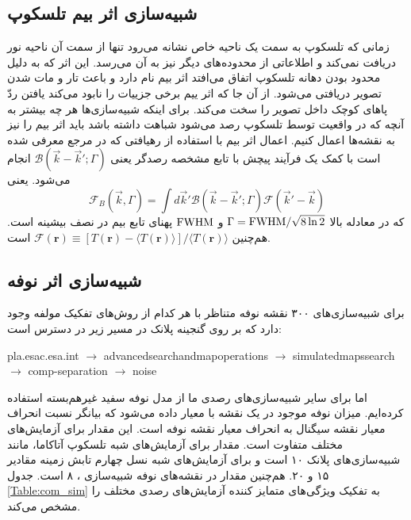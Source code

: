 \subsection{شبیه‌سازی اثر بیم تلسکوپ} 
 زمانی که تلسکوپ به سمت یک ناحیه خاص نشانه می‌رود تنها از سمت آن ناحیه نور دریافت نمی‌کند و اطلاعاتی از محدوده‌های دیگر نیز به آن می‌رسد. این اثر که به دلیل محدود بودن دهانه تلسکوپ اتفاق می‌افتد اثر بیم
  نام دارد و باعث تار و مات شدن تصویر دریافتی می‌شود. از آن جا که اثر ییم برخی جزییات را نابود می‌کند یافتن ردّ پاهای کوچک داخل تصویر را سخت می‌کند. برای اینکه شبیه‌سازی‌ها هر چه بیشتر به آنچه که در واقعیت توسط تلسکوپ رصد می‌شود شباهت داشته باشد باید اثر بیم را نیز به نقشه‌ها اعمال کنیم. 
 اعمال اثر بیم با استفاده از رهیافتی که در مرجع  
 \cite{Bond:1987ub}
 معرفی شده است با کمک یک فرآیند پیچش با تابع مشخصه رصدگر یعنی $\mathcal{B}(\vec{k}-\vec{k}';\Gamma)$ انجام می‌شود. یعنی 
 \begin{equation} 
 \label{convlo} 
 {\mathcal{F}}_{B}(\vec{k},\Gamma)=\int d\vec{k}'\mathcal{B}(\vec{k}-\vec{k}';\Gamma){\mathcal{F}}(\vec{k}'-\vec{k}) 
 \end{equation} 
 که در معادله بالا $\Gamma={\rm FWHM}/\sqrt{8\ln 2}$ و ${\rm FWHM}$ پهنای تابع بیم در نصف بیشینه 
 است. هم‌چنین 
 $\mathcal{F}(\textbf{r})\equiv [T(\textbf{r})-\langle T(\textbf{r})\rangle]/\langle T(\textbf{r})\rangle$
 است.
\subsection{شبیه‌سازی اثر نوفه} 
 برای شبیه‌سازی‌های 
 ۳۰۰ نقشه نوفه
  متناظر با هر کدام از روش‌های تفکیک مولفه وجود دارد که بر روی گنجینه پلانک در مسیر زیر در دسترس است:\\
 \begin{latin}
  pla.esac.esa.int $\to$ advanced\;search\;and\;map\;operations $\to$ simulated\;maps\;search $\to$ comp-separation $\to$ noise	
 \end{latin}

   اما برای سایر شبیه‌سازی‌های رصدی ما از مدل نوفه سفید غیرهم‌بسته استفاده کرده‌ایم.
 میزان نوفه موجود در یک نقشه با معیار 
 داده می‌شود که بیانگر نسبت انحراف معیار نقشه سیگنال به انحراف معیار نقشه نوفه است. این مقدار برای آزمایش‌های مختلف متفاوت است. مقدار  برای آزمایش‌های شبه تلسکوپ آتاکاما، مانند شبیه‌سازی‌های پلانک ۱۰ است و برای آزمایش‌های شبه نسل چهارم تابش زمینه مقادیر ۱۵ و ۲۰. هم‌چنین مقدار  در نقشه‌های نوفه شبیه‌سازی 
    ، ۸ است. جدول 
 \ref{Table:com_sim}
 به تفکیک ویژگی‌های متمایز کننده آزمایش‌های رصدی مختلف را مشخص می‌کند.

